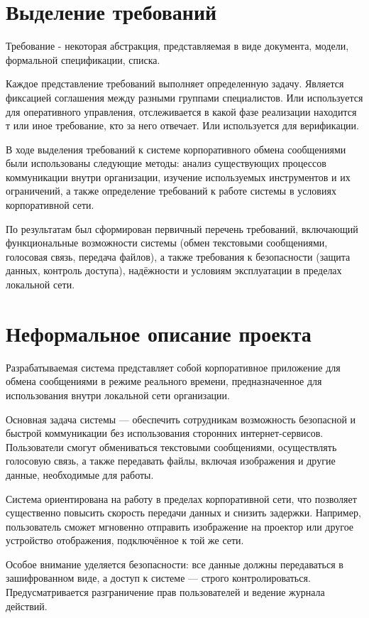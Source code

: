 \documentclass[14pt,a4paper]{extarticle}
\begin{document}
\section{Выделение требований}

Требование - некоторая абстракция, представляемая в виде документа, модели, формальной
спецификации, списка.

Каждое представление требований выполняет определенную задачу. Является
фиксацией соглашения между разными группами специалистов. Или используется для
оперативного управления, отслеживается в какой фазе реализации находится т или
иное требование, кто за него отвечает. Или используется для верификации.

В ходе выделения требований к системе корпоративного обмена сообщениями были использованы следующие методы: анализ существующих процессов коммуникации внутри организации, изучение используемых инструментов и их ограничений, а также определение требований к работе системы в условиях корпоративной сети.

По результатам был сформирован первичный перечень требований, включающий функциональные возможности системы (обмен текстовыми сообщениями, голосовая связь, передача файлов), а также требования к безопасности (защита данных, контроль доступа), надёжности и условиям эксплуатации в пределах локальной сети.

\section{Неформальное описание проекта}

Разрабатываемая система представляет собой корпоративное приложение для обмена
сообщениями в режиме реального времени, предназначенное для использования
внутри локальной сети организации.

Основная задача системы — обеспечить сотрудникам возможность безопасной и
быстрой коммуникации без использования сторонних интернет-сервисов.
Пользователи смогут обмениваться текстовыми сообщениями, осуществлять голосовую
связь, а также передавать файлы, включая изображения и другие данные,
необходимые для работы.

Система ориентирована на работу в пределах корпоративной сети, что позволяет
существенно повысить скорость передачи данных и снизить задержки. Например,
пользователь сможет мгновенно отправить изображение на проектор или другое
устройство отображения, подключённое к той же сети.

Особое внимание уделяется безопасности: все данные должны передаваться в
зашифрованном виде, а доступ к системе — строго контролироваться.
Предусматривается разграничение прав пользователей и ведение журнала действий.
\end{document}
